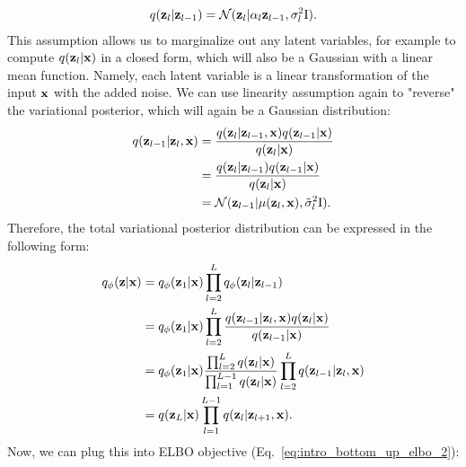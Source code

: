 \begin{equation}
\begin{aligned}
    q({\mathbf{z}}_l|{\mathbf{z}}_{l-1}) = \mathcal{N}({\mathbf{z}}_l | \alpha_l {\mathbf{z}}_{l-1}, \sigma_l^2\text{I}).
\end{aligned}
\end{equation}
This assumption allows us to marginalize out any latent variables, for example to compute $q({\mathbf{z}}_l|{\mathbf{x}})$ in a closed form, which will also be a Gaussian with a linear mean function. Namely, each latent variable is a linear transformation of the input ${\mathbf{x}}$ with the added noise.
 We can use linearity assumption again to "reverse" the variational posterior, which will again be a Gaussian distribution:
\begin{align}
q({\mathbf{z}}_{l-1} |{\mathbf{z}}_l, {\mathbf{x}}) &= \frac{q({\mathbf{z}}_l|{\mathbf{z}}_{l-1}, {\mathbf{x}})q({\mathbf{z}}_{l-1}|{\mathbf{x}})}{q({\mathbf{z}}_l|{\mathbf{x}})}\\
&= \frac{q({\mathbf{z}}_l|{\mathbf{z}}_{l-1})q({\mathbf{z}}_{l-1}|{\mathbf{x}})}{q({\mathbf{z}}_l|{\mathbf{x}})} \\
& = \mathcal{N}({\mathbf{z}}_{l-1} | \mu({\mathbf{z}}_l, {\mathbf{x}}), \tilde{\sigma}^2_l\text{I}).
\end{align}
Therefore, the total variational posterior distribution can be expressed in the following form:
\begin{align}
    q_{\phi}({\mathbf{z}}|{\mathbf{x}}) &= q_{\phi}({\mathbf{z}}_1|{\mathbf{x}})\prod_{l=2}^L q_{\phi}({\mathbf{z}}_l|{\mathbf{z}}_{l-1}) \\
    & = q_{\phi}({\mathbf{z}}_1|{\mathbf{x}})\prod_{l=2}^L \frac{q({\mathbf{z}}_{l-1} |{\mathbf{z}}_l, {\mathbf{x}})q({\mathbf{z}}_l|{\mathbf{x}})}{q({\mathbf{z}}_{l-1}|{\mathbf{x}})}\\
    & = q_{\phi}({\mathbf{z}}_1|{\mathbf{x}})  \frac{\prod_{l=2}^L q({\mathbf{z}}_l|{\mathbf{x}})}{\prod_{l=1}^{L-1} q({\mathbf{z}}_{l}|{\mathbf{x}})}\prod_{l=2}^L q({\mathbf{z}}_{l-1} |{\mathbf{z}}_l, {\mathbf{x}})\\
    & = q({\mathbf{z}}_L|{\mathbf{x}})\prod_{l=1}^{L-1} q({\mathbf{z}}_{l} |{\mathbf{z}}_{l+1}, {\mathbf{x}}).
\end{align}
Now, we can plug this into ELBO objective (Eq.~\ref{eq:intro_bottom_up_elbo_2}):
